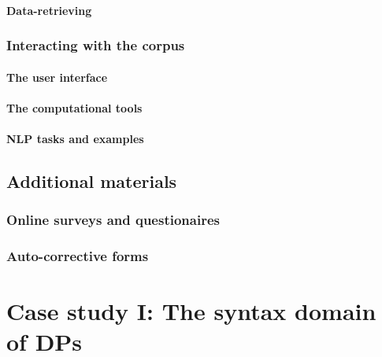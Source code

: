 \documentclass[
  a4paper,
  twoside,
  12pt,
  chapterprefix=false,
  bibliography=totocnumbered,
  listof=flat]{scrbook}
\begin{document}
\hypertarget{data-retrieving}{%
\subsubsection{Data-retrieving}\label{data-retrieving}}

\hypertarget{interacting-with-the-corpus}{%
\subsection{Interacting with the corpus}\label{interacting-with-the-corpus}}

\hypertarget{the-user-interface}{%
\subsubsection{The user interface}\label{the-user-interface}}

\hypertarget{the-computational-tools}{%
\subsubsection{The computational tools}\label{the-computational-tools}}

\hypertarget{nlp-tasks-and-examples}{%
\subsubsection{NLP tasks and examples}\label{nlp-tasks-and-examples}}

\hypertarget{additional-materials}{%
\section{Additional materials}\label{additional-materials}}

\hypertarget{online-surveys-and-questionaires}{%
\subsection{Online surveys and questionaires}\label{online-surveys-and-questionaires}}

\hypertarget{auto-corrective-forms}{%
\subsection{Auto-corrective forms}\label{auto-corrective-forms}}

\hypertarget{case-study-i-the-syntax-domain-of-dps}{%
\chapter{Case study I: The syntax domain of DPs}\label{case-study-i-the-syntax-domain-of-dps}}
\end{document}
